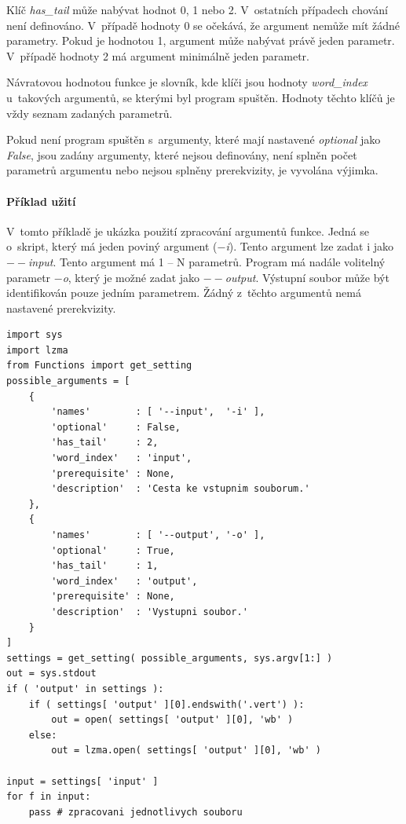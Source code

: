 Klíč \textit{has\_tail} může nabývat hodnot 0, 1 nebo 2. V~ostatních případech chování není definováno.
V~případě hodnoty 0 se očekává, že argument nemůže mít žádné parametry. Pokud je hodnotou 1, argument může
nabývat právě jeden parametr. V~případě hodnoty 2 má argument minimálně jeden parametr.

Návratovou hodnotou funkce je slovník, kde klíči jsou hodnoty \textit{word\_index} u~takových argumentů, se kterými
byl program spuštěn. Hodnoty těchto klíčů je vždy seznam zadaných parametrů.

Pokud není program spuštěn s~argumenty,
které mají nastavené \textit{optional} jako \textit{False}, jsou zadány argumenty, které nejsou definovány, není splněn
počet parametrů argumentu nebo nejsou splněny prerekvizity, je vyvolána výjimka.

\paragraph{Příklad užití}

V~tomto příkladě je ukázka použití zpracování argumentů funkce. Jedná se o~skript, který má jeden poviný
argument (\textit{$-$i}). Tento argument lze zadat i jako \textit{$--$input}. Tento argument má
1 -- N parametrů. Program má nadále volitelný parametr \textit{$-$o}, který je možné zadat jako
\textit{$--$output}. Výstupní soubor může být identifikován pouze jedním parametrem.
Žádný z~těchto argumentů nemá nastavené prerekvizity.
\begin{lstlisting}
import sys
import lzma
from Functions import get_setting
possible_arguments = [
    {
        'names'        : [ '--input',  '-i' ],
        'optional'     : False,
        'has_tail'     : 2,
        'word_index'   : 'input',
        'prerequisite' : None,
        'description'  : 'Cesta ke vstupnim souborum.'
    },
    {
        'names'        : [ '--output', '-o' ],
        'optional'     : True,
        'has_tail'     : 1,
        'word_index'   : 'output',
        'prerequisite' : None,
        'description'  : 'Vystupni soubor.'
    }
]
settings = get_setting( possible_arguments, sys.argv[1:] )
out = sys.stdout
if ( 'output' in settings ):
    if ( settings[ 'output' ][0].endswith('.vert') ):
        out = open( settings[ 'output' ][0], 'wb' )
    else:
        out = lzma.open( settings[ 'output' ][0], 'wb' )

input = settings[ 'input' ]
for f in input:
    pass # zpracovani jednotlivych souboru
\end{lstlisting}

